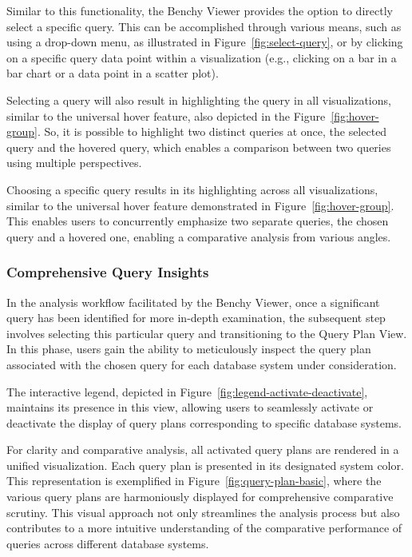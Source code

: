 Similar to this functionality, the Benchy Viewer provides the option to directly select a specific query. This can be accomplished through various means, such as using a drop-down menu, as illustrated in Figure~\ref{fig:select-query}, or by clicking on a specific query data point within a visualization (e.g., clicking on a bar in a bar chart or a data point in a scatter plot).


Selecting a query will also result in highlighting the query in all visualizations, similar to the universal hover feature, also depicted in the Figure~\ref{fig:hover-group}. So, it is possible to highlight two distinct queries at once, the selected query and the hovered query, which enables a comparison between two queries using multiple perspectives. 

Choosing a specific query results in its highlighting across all visualizations, similar to the universal hover feature demonstrated in Figure~\ref{fig:hover-group}. This enables users to concurrently emphasize two separate queries, the chosen query and a hovered one, enabling a comparative analysis from various angles.

\subsubsection{Comprehensive Query Insights}

In the analysis workflow facilitated by the Benchy Viewer, once a significant query has been identified for more in-depth examination, the subsequent step involves selecting this particular query and transitioning to the Query Plan View. In this phase, users gain the ability to meticulously inspect the query plan associated with the chosen query for each database system under consideration.

The interactive legend, depicted in Figure~\ref{fig:legend-activate-deactivate}, maintains its presence in this view, allowing users to seamlessly activate or deactivate the display of query plans corresponding to specific database systems.

For clarity and comparative analysis, all activated query plans are rendered in a unified visualization. Each query plan is presented in its designated system color. This representation is exemplified in Figure~\ref{fig:query-plan-basic}, where the various query plans are harmoniously displayed for comprehensive comparative scrutiny. This visual approach not only streamlines the analysis process but also contributes to a more intuitive understanding of the comparative performance of queries across different database systems.


